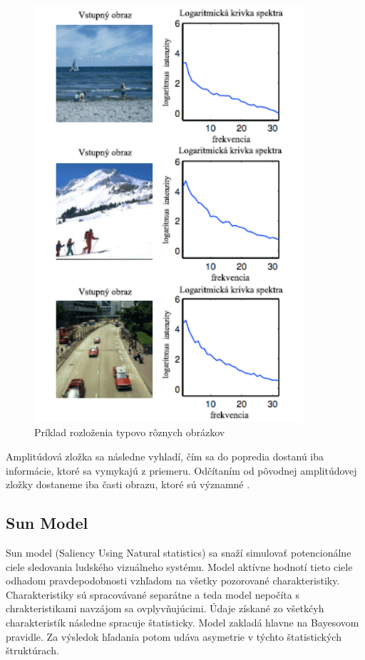 \begin{figure}[H]
  \centering
  \includegraphics[width=10cm]{pics/spectral-img.png}
  \caption{Príklad rozloženia typovo rôznych obrázkov\cite{spectral-rezidual}}\label{wrap-fig:2}
\end{figure}
\vspace{10mm}

Amplitúdová zložka sa následne vyhladí, čím sa do popredia dostanú iba informácie, ktoré sa vymykajú z priemeru.
Odčítaním od pôvodnej amplitúdovej zložky dostaneme iba časti obrazu, ktoré sú významné \cite{spectral-rezidual}.
\subsection{Sun Model}
Sun model (Saliency Using Natural statistics) sa snaží simulovať potencionálne ciele sledovania ludského vizuálneho systému.
Model aktívne hodnotí tieto ciele odhadom pravdepodobnosti vzhľadom na všetky pozorované charakteristiky.
Charakteristiky sú spracovávané separátne a teda model nepočíta s chrakteristikami navzájom sa ovplyvňujúcimi.
Údaje získané zo všetkćyh charakteristík  následne spracuje štatisticky.
Model zakladá hlavne na Bayesovom pravidle.
Za výsledok hľadania potom udáva asymetrie v týchto štatistických štruktúrach\cite{sun-1}.

